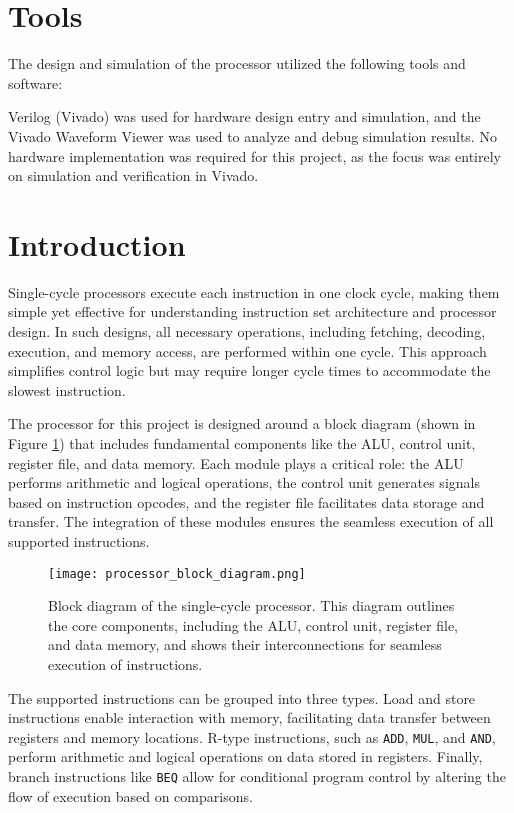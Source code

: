 \documentclass[12pt]{article}
\begin{document}
\section*{Tools}

The design and simulation of the processor utilized the following tools and software:

Verilog (Vivado) was used for hardware design entry and simulation, and the Vivado Waveform Viewer was used to analyze and debug simulation results. No hardware implementation was required for this project, as the focus was entirely on simulation and verification in Vivado.

\section*{Introduction}

Single-cycle processors execute each instruction in one clock cycle, making them simple yet effective for understanding instruction set architecture and processor design. In such designs, all necessary operations, including fetching, decoding, execution, and memory access, are performed within one cycle. This approach simplifies control logic but may require longer cycle times to accommodate the slowest instruction.

The processor for this project is designed around a block diagram (shown in Figure \ref{fig:processor_block_diagram}) that includes fundamental components like the ALU, control unit, register file, and data memory. Each module plays a critical role: the ALU performs arithmetic and logical operations, the control unit generates signals based on instruction opcodes, and the register file facilitates data storage and transfer. The integration of these modules ensures the seamless execution of all supported instructions.

\begin{figure}[ht!]
    \centering
    \texttt{[image: processor\_block\_diagram.png]}
    \caption{Block diagram of the single-cycle processor. This diagram outlines the core components, including the ALU, control unit, register file, and data memory, and shows their interconnections for seamless execution of instructions.}
    \label{fig:processor_block_diagram}
\end{figure}

The supported instructions can be grouped into three types. Load and store instructions enable interaction with memory, facilitating data transfer between registers and memory locations. R-type instructions, such as \texttt{ADD}, \texttt{MUL}, and \texttt{AND}, perform arithmetic and logical operations on data stored in registers. Finally, branch instructions like \texttt{BEQ} allow for conditional program control by altering the flow of execution based on comparisons.
\end{document}
